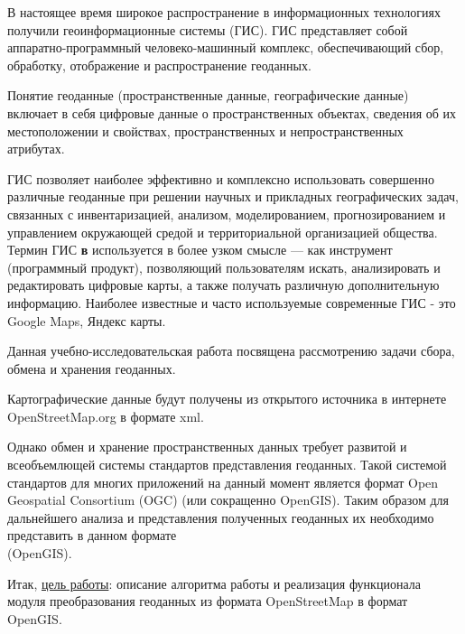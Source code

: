 \documentclass[12pt,a4paper,oneside]{article} %
\begin{document}
В настоящее время широкое распространение в информационных \linebreak %
технологиях получили геоинформационные системы (ГИС). ГИС  \linebreak %
представляет собой аппаратно-программный человеко-машинный \linebreak %
комплекс, обеспечивающий сбор, обработку, отображение и \linebreak
распространение геоданных.

Понятие геоданные (пространственные данные, географические данные) 
включает в себя цифровые данные о пространственных объектах, сведения 
об их местоположении и свойствах, пространственных и непространственных атрибутах.

ГИС позволяет наиболее эффективно и комплексно  использовать совершенно 
различные геоданные при решении научных и прикладных географических задач, 
связанных с инвентаризацией, анализом, моделированием, прогнозированием и 
управлением окружающей средой и территориальной организацией общества. 
Термин ГИС {\bf \LARGE в} используется в более узком смысле — как инструмент (программный 
продукт), позволяющий пользователям искать, анализировать и редактировать 
цифровые карты, а также получать различную дополнительную информацию. 
Наиболее известные и часто используемые современные ГИС - это Google Maps, Яндекс карты.

Данная учебно-исследовательская работа посвящена рассмотрению задачи сбора, обмена и хранения геоданных. 

Картографические данные будут получены из открытого источника в интернете OpenStreetMap.org в формате xml.

Однако обмен и хранение пространственных данных требует развитой и всеобъемлющей системы стандартов представления геоданных. Такой системой стандартов для многих приложений на данный момент является формат Open Geospatial Consortium (OGC) (или сокращенно OpenGIS).  Таким образом  для дальнейшего анализа и представления полученных геоданных их необходимо представить в данном формате \\ (OpenGIS).

Итак, \underline{цель работы}: описание алгоритма работы и реализация функционала модуля преобразования геоданных из формата OpenStreetMap в формат OpenGIS.


\end{document}
